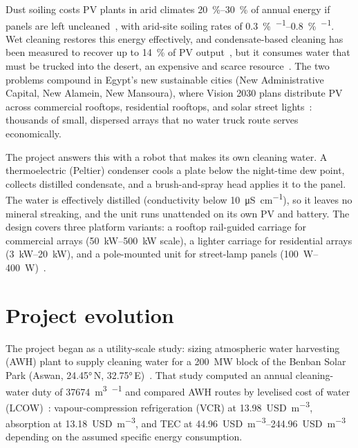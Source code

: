 \documentclass[11pt,a4paper]{article}
\begin{document}
Dust soiling costs PV plants in arid climates \SIrange{20}{30}{\percent}
of annual energy if panels are left
uncleaned~\cite{kazem2023soiling,sarver2013pvsoiling,caron2013soiling},
with arid-site soiling rates of \SIrange{0.3}{0.8}{\percent\per\dy}.
Wet cleaning restores this energy effectively, and condensate-based
cleaning has been measured to recover up to \SI{14}{\percent} of PV
output~\cite{shah2023condensate}, but it consumes water that must be
trucked into the desert, an expensive and scarce
resource~\cite{mejia2021cleaning}. The two problems compound in Egypt's
new sustainable cities (New Administrative Capital, New Alamein, New
Mansoura), where Vision 2030 plans distribute PV across commercial
rooftops, residential rooftops, and solar street
lights~\cite{egypt2030vision}: thousands of small, dispersed arrays that
no water truck route serves economically.

The project answers this with a robot that makes its own cleaning water.
A thermoelectric (Peltier) condenser cools a plate below the night-time
dew point, collects distilled condensate, and a brush-and-spray head
applies it to the panel. The water is effectively distilled
(conductivity below \SI{10}{\micro\siemens\per\centi\meter}), so it
leaves no mineral streaking, and the unit runs unattended on its own PV
and battery. The design covers three platform variants: a rooftop
rail-guided carriage for commercial arrays (\SIrange{50}{500}{\kilo\watt} scale), a
lighter carriage for residential arrays (\SIrange{3}{20}{\kilo\watt}), and
a pole-mounted unit for street-lamp panels
(\SIrange{100}{400}{\watt})~\cite{mohammed2021streetlamp}.

\section{Project evolution}
\label{sec:evolution}

The project began as a utility-scale study: sizing atmospheric water
harvesting (AWH) plant to supply cleaning water for a
\SI{200}{\mega\watt} block of the Benban Solar Park (Aswan,
\ang{24.45}\,N, \ang{32.75}\,E)~\cite{benban_irena}. That study computed
an annual cleaning-water duty of \SI{37674}{\cubic\meter\per\year} and
compared AWH routes by levelised cost of water
(LCOW)~\cite{kim2022lcow,bagheri2024sec}: vapour-compression
refrigeration (VCR) at \SI{13.98}{USD\per\cubic\meter}, absorption at
\SI{13.18}{USD\per\cubic\meter}, and TEC at
\SIrange{44.96}{244.96}{USD\per\cubic\meter} depending on the assumed
specific energy consumption.
\end{document}
